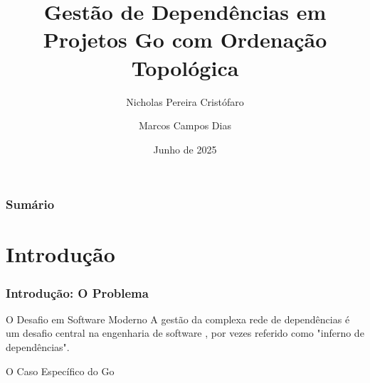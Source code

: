 \documentclass{beamer}
\title[Análise de Dependências Go]{Gestão de Dependências em Projetos Go com Ordenação Topológica}
\author{Nicholas Pereira Cristófaro \and Marcos Campos Dias}
\institute{Pontifícia Universidade Católica de Minas Gerais (PUC Minas)}
\date{Junho de 2025}
\begin{document}
\begin{frame}
  \titlepage
\end{frame}

\begin{frame}
    \frametitle{Sumário}
    \tableofcontents
\end{frame}

\section{Introdução}
\begin{frame}
  \frametitle{Introdução: O Problema}
  
  \begin{block}{O Desafio em Software Moderno}
    A gestão da complexa rede de dependências é um desafio central na engenharia de software , por vezes referido como "inferno de dependências".
  \end{block}
  
  \begin{alertblock}{O Caso Específico do Go}
  \end{alertblock}
\end{frame}
\end{document}

